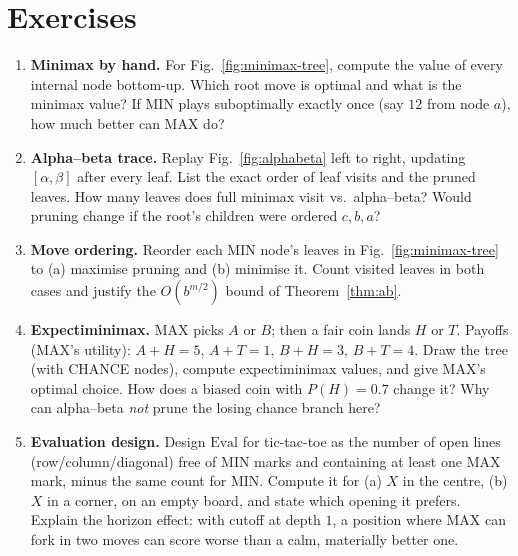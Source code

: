 \section{Exercises}
\label{sec:ch05-ex}
\begin{enumerate}[label=E5.\arabic*, leftmargin=*, itemsep=0.75em]
    \item \textbf{Minimax by hand.} For Fig.~\ref{fig:minimax-tree}, compute the value of every internal node bottom-up. Which root move is optimal and what is the minimax value? If MIN plays suboptimally exactly once (say $12$ from node $a$), how much better can MAX do?
    \item \textbf{Alpha--beta trace.} Replay Fig.~\ref{fig:alphabeta} left to right, updating $[\alpha,\beta]$ after every leaf. List the exact order of leaf visits and the pruned leaves. How many leaves does full minimax visit vs.\ alpha--beta? Would pruning change if the root's children were ordered $c,b,a$?
    \item \textbf{Move ordering.} Reorder each MIN node's leaves in Fig.~\ref{fig:minimax-tree} to (a) maximise pruning and (b) minimise it. Count visited leaves in both cases and justify the $O(b^{m/2})$ bound of Theorem~\ref{thm:ab}.
    \item \textbf{Expectiminimax.} MAX picks $A$ or $B$; then a fair coin lands $H$ or $T$. Payoffs (MAX's utility): $A\!+\!H=5$, $A\!+\!T=1$, $B\!+\!H=3$, $B\!+\!T=4$. Draw the tree (with CHANCE nodes), compute expectiminimax values, and give MAX's optimal choice. How does a biased coin with $P(H)=0.7$ change it? Why can alpha--beta \emph{not} prune the losing chance branch here?
    \item \textbf{Evaluation design.} Design $\text{Eval}$ for tic-tac-toe as the number of open lines (row/column/diagonal) free of MIN marks and containing at least one MAX mark, minus the same count for MIN. Compute it for (a) $X$ in the centre, (b) $X$ in a corner, on an empty board, and state which opening it prefers. Explain the horizon effect: with cutoff at depth $1$, a position where MAX can fork in two moves can score worse than a calm, materially better one.
\end{enumerate}
